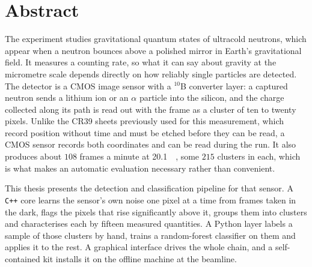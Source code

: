 \documentclass[a4paper,headsepline,oneside,11pt]{scrartcl}
\begin{document}

\newpage
\thispagestyle{empty}
\mbox{}
\newpage

\section*{Abstract}
\label{sec:Abstract}

The \qbounce{} experiment studies gravitational quantum states of ultracold
neutrons, which appear when a neutron bounces above a polished mirror in Earth's
gravitational field. It measures a counting rate, so what it can say about
gravity at the micrometre scale depends directly on how reliably single
particles are detected. The detector is a CMOS image sensor with a $^{10}$B
converter layer: a captured neutron sends a lithium ion or an $\alpha$ particle
into the silicon, and the charge collected along its path is read out with the
frame as a cluster of ten to twenty pixels. Unlike the CR39 sheets previously
used for this measurement, which record position without time and must be etched
before they can be read, a CMOS sensor records both coordinates and can be read
during the run. It also produces about $108$ frames a minute at \SI{20.1}{\mega\pixel},
some $215$ clusters in each, which is what makes an automatic evaluation
necessary rather than convenient.

This thesis presents the detection and classification pipeline for that sensor.
A \texttt{C++} core learns the sensor's own noise one pixel at a time from
frames taken in the dark, flags the pixels that rise significantly above it,
groups them into clusters and characterises each by fifteen measured quantities.
A Python layer labels a sample of those clusters by hand, trains a random-forest
classifier on them and applies it to the rest. A graphical interface drives the
whole chain, and a self-contained kit installs it on the offline machine at the
beamline.
\end{document}
